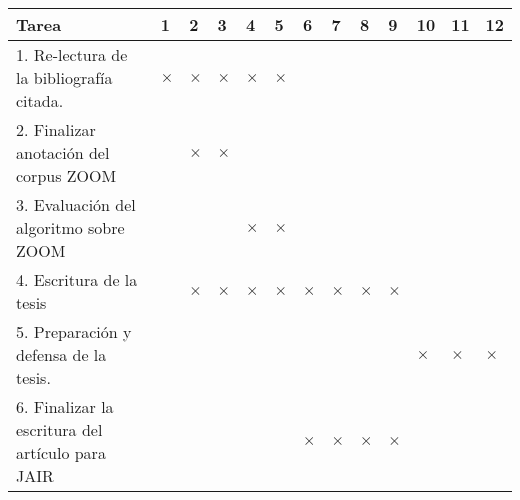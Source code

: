 {\footnotesize
\begin{center}
\begin{tabular}{|p{7cm}||p{2mm}|p{2mm}|p{2mm}|p{2mm}||p{2mm}|p{2mm}|p{2mm}|p{2mm
}||p{2mm}|p{2mm}|p{2mm}|p{2mm}|}
\hline
 \rowcolor[rgb]{0.8,0.8,0.8}\hspace{3.5cm}Tarea & 1 & 2 & 3 & 4 & 5 & 6 & 7 & 8
& 9 & 10 & 11 & 12\\
\hline 1. Re-lectura de la bibliograf\'ia citada. & $\times$ & $\times$ & $\times$ & $\times$ & $\times$ &&&&&&&\\
\hline 2. Finalizar anotaci\'on del corpus ZOOM &  & $\times$ & $\times$ &  && &&&&&&\\
\hline 3. Evaluaci\'on del algoritmo sobre ZOOM &  &          &          & $\times$ & $\times$ & &&&&&&\\
\hline 4. Escritura de la tesis & &$\times$&$\times$& $\times$ & $\times$ & $\times$ & $\times$ & $\times$ & $\times$ &&&\\
\hline 5. Preparaci\'on y defensa de la tesis. & & &  &&&&&&&$\times$&$\times$&$\times$\\
\hline 6. Finalizar la escritura del art\'iculo para JAIR && &  &&&$\times$&$\times$&$\times$&$\times$&&&\\
\hline
\end{tabular}\end{center}
}


